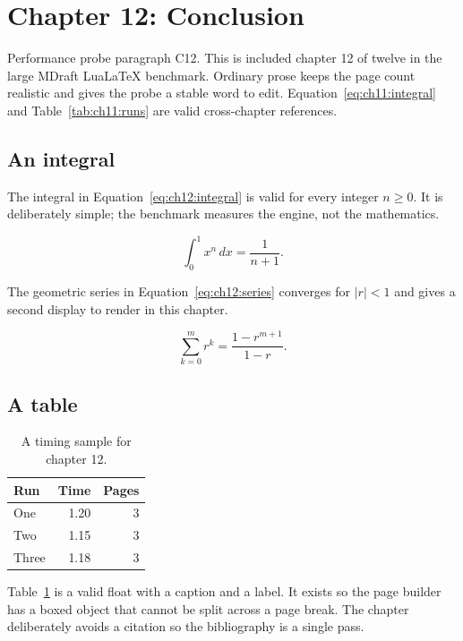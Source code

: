 \section{Chapter 12: Conclusion}
\label{sec:ch12}

Performance probe paragraph C12. This is included chapter 12 of twelve in
the large MDraft LuaLaTeX benchmark. Ordinary prose keeps the page count
realistic and gives the probe a stable word to edit. Equation~\ref{eq:ch11:integral} and
Table~\ref{tab:ch11:runs} are valid cross-chapter references.

\subsection{An integral}
The integral in Equation~\ref{eq:ch12:integral} is valid for every integer
$n \ge 0$. It is deliberately simple; the benchmark measures the engine, not
the mathematics.

\begin{equation}
  \label{eq:ch12:integral}
  \int_{0}^{1} x^{n}\,dx = \frac{1}{n+1}.
\end{equation}

The geometric series in Equation~\ref{eq:ch12:series} converges for
$|r| < 1$ and gives a second display to render in this chapter.

\begin{equation}
  \label{eq:ch12:series}
  \sum_{k=0}^{m} r^{k} = \frac{1-r^{m+1}}{1-r}.
\end{equation}

\subsection{A table}
\begin{table}[h]
  \centering
  \begin{tabular}{lrr}
    \toprule
    Run & Time & Pages \\
    \midrule
    One   & 1.20 & 3 \\
    Two   & 1.15 & 3 \\
    Three & 1.18 & 3 \\
    \bottomrule
  \end{tabular}
  \caption{A timing sample for chapter 12.}
  \label{tab:ch12:runs}
\end{table}

Table~\ref{tab:ch12:runs} is a valid float with a caption and a label. It
exists so the page builder has a boxed object that cannot be split across a
page break. The chapter deliberately avoids a citation so the bibliography is a single pass.

